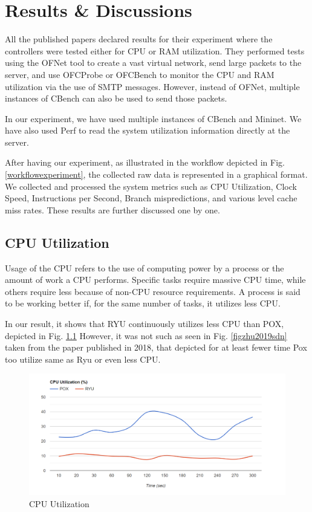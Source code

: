 \chapter{Results \& Discussions}

All the published papers declared results for their experiment where the controllers were tested either for CPU or RAM utilization. They performed tests using the OFNet tool to create a vast virtual network, send large packets to the server, and use OFCProbe or OFCBench to monitor the CPU and RAM utilization via the use of SMTP messages. However, instead of OFNet, multiple instances of CBench can also be used to send those packets.

In our experiment, we have used multiple instances of CBench and Mininet. We have also used Perf to read the system utilization information directly at the server.

After having our experiment, as illustrated in the workflow depicted in Fig. \ref{workflowexperiment}, the collected raw data is represented in a graphical format. We collected and processed the system metrics such as CPU Utilization, Clock Speed, Instructions per Second, Branch mispredictions, and various level cache miss rates. These results are further discussed one by one.

\section{CPU Utilization}

Usage of the CPU refers to the use of computing power by a process or the amount of work a CPU performs. Specific tasks require massive CPU time, while others require less because of non-CPU resource requirements. A process is said to be working better if, for the same number of tasks, it utilizes less CPU.

In our result, it shows that RYU continuously utilizes less CPU than POX, depicted in Fig. \ref{CPUutilization} However, it was not such as seen in Fig. \ref{figzhu2019sdn} taken from the paper published in 2018, that depicted for at least fewer time Pox too utilize same as Ryu or even less CPU. \cite{zhu2019sdn}

\begin{figure}[!hbt]
    \centering
        \includegraphics[width=\textwidth,keepaspectratio]{images/cpu_utilization.png}
       \caption{CPU Utilization}
        \label{CPUutilization}
\end{figure}

